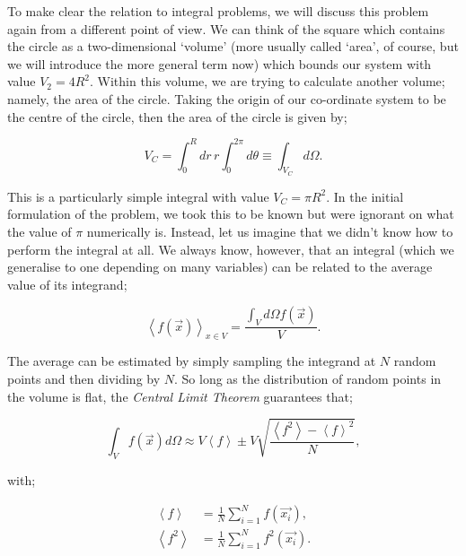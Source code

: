 To make clear the relation to integral problems, we will discuss this problem again from a different point of view. We can think of the square which contains the circle as a two-dimensional `volume' (more usually called `area', of course, but we will introduce the more general term now) which bounds our system with value $V_2 = 4 R^2$. Within this volume, we are trying to calculate another volume; namely, the area of the circle. Taking the origin of our co-ordinate system to be the centre of the circle, then the area of the circle is given by;

\begin{equation}
V_C = \int_0^R dr \hspace{2pt} r \int_0^{2 \pi} d \theta \equiv \int_{V_C} d \Omega.
\end{equation}

This is a particularly simple integral with value $V_C = \pi R^2$. In the initial formulation of the problem, we took this to be known but were ignorant on what the value of $\pi$ numerically is. Instead, let us imagine that we didn't know how to perform the integral at all. We always know, however, that an integral (which we generalise to one depending on many variables) can be related to the average value of its integrand;

\begin{equation}
\left< f(\vec{x}) \right>_{x \in V} = \frac{\int_V d \Omega f(\vec{x})}{V}.
\end{equation}

The average can be estimated by simply sampling the integrand at $N$ random points and then dividing by $N$. So long as the distribution of random points in the volume is flat, the \emph{Central Limit Theorem} guarantees that;

\begin{equation}
\int_V f(\vec{x}) d \Omega \approx V \left<f \right> \pm V \sqrt{\frac{\left<f^2 \right> - \left<f \right>^2}{N}},
\label{eqn:mcmaster}
\end{equation}

with;

\begin{subequations}
\begin{align}
\left<f \right> &= \frac{1}{N} \sum_{i=1}^{N} f(\vec{x_i}), \\
\left<f^2 \right> &= \frac{1}{N} \sum_{i=1}^{N} f^2(\vec{x_i}).
\end{align}
\end{subequations}

